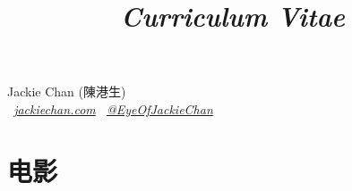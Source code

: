 \documentclass[11pt,a4paper]{moderncv}
\title{\emph{Curriculum Vitae}}
\begin{document}
\begin{CJK*}{UTF8}{gbsn}

\begin{center}
\Huge{Jackie Chan (陳港生)}\\ \normalsize
\vspace{3mm}
\emph{
\faGlobe\ \emph{\href{http://www.jackiechan.com/}{jackiechan.com}}
\hspace{3mm} 
\faTwitter\  \emph{\href{http://twitter.com/EyeOfJackieChan}{@EyeOfJackieChan}}}
\vspace{3mm}
\end{center}

\section{电影}

\end{CJK*}
\end{document}
